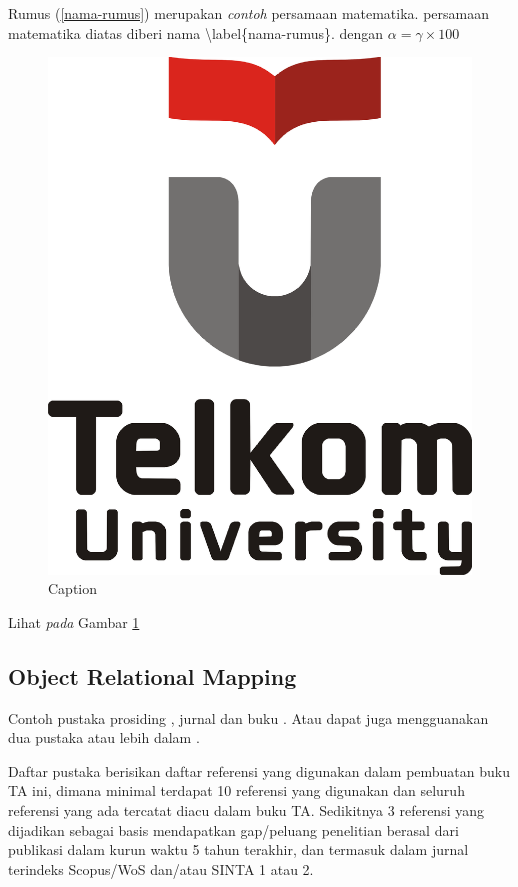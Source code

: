 Rumus (\ref{nama-rumus}) merupakan \textit{contoh} persamaan matematika. persamaan matematika diatas diberi nama \textbackslash label\{nama-rumus\}. dengan $\alpha=\gamma \times 100$

\begin{figure}[h!]
    \centering
    \includegraphics[scale=0.3]{Tel-U-Logo.png}
    \caption{Caption}
    \label{fig:my_label}
\end{figure}

Lihat \textit{pada} Gambar \ref{fig:my_label}

\subsection{Object Relational Mapping}
Contoh pustaka prosiding \cite{doyen2014explicit}, jurnal \cite{gunawan2015hydrostatic} dan buku \cite{toro2013riemann}. Atau dapat juga mengguanakan dua pustaka atau lebih dalam \cite{gunawan2015hydrostatic,toro2013riemann}.

Daftar pustaka berisikan daftar referensi yang digunakan dalam pembuatan buku TA ini, dimana minimal terdapat 10 referensi yang digunakan dan seluruh referensi yang ada tercatat diacu dalam buku TA. Sedikitnya 3 referensi yang dijadikan sebagai basis mendapatkan gap/peluang penelitian berasal dari publikasi dalam kurun waktu 5 tahun terakhir, dan termasuk dalam jurnal terindeks Scopus/WoS dan/atau SINTA 1 atau 2.


